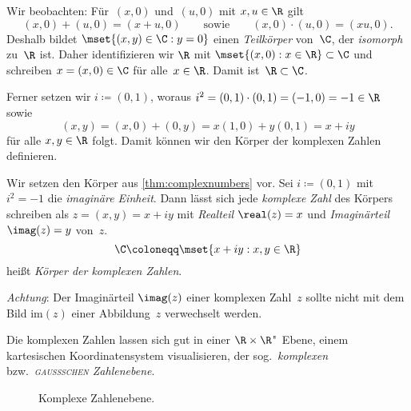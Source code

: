 \documentclass[a4paper]{article}
\begin{document}
Wir beobachten: Für~$(x, 0)$ und~$(u, 0)$ mit $x,u \in \R$ gilt
\begin{equation*}
    (x, 0) + (u, 0) = (x+u, 0) \qquad\text{sowie}\qquad (x, 0) \cdot (u, 0) = (xu, 0).
\end{equation*}
Deshalb bildet $\mset{(x,y) \in \C : y = 0}$ einen \emph{Teilkörper} von~$\C$, der \emph{isomorph} zu~$\R$ ist. Daher identifizieren wir $\R$ mit $\mset{(x, 0) : x \in \R} \subset \C$ und schreiben $x = (x, 0) \in \C$ für alle~$x \in \R$. Damit ist~$\R \subset \C$.

Ferner setzen wir $i \coloneqq (0, 1)$, woraus $i^2 = (0, 1)\cdot(0, 1) = (-1, 0) = -1 \in \R$ sowie
\begin{equation*}
    (x,y) = (x, 0)+(0,y) = x(1, 0)+y(0, 1) = x+iy
\end{equation*}
für alle $x,y \in \R$ folgt. Damit können wir den Körper der komplexen Zahlen definieren.

\begin{definition}
    Wir setzen den Körper aus \cref{thm:complexnumbers} vor. Sei $i \coloneqq (0, 1)$ mit~$i^2 = -1$ die \emph{imaginäre Einheit}. Dann lässt sich jede \emph{komplexe Zahl} des Körpers schreiben als $z = (x,y) = x+iy$ mit \emph{Realteil} $\real(z) = x$ und \emph{Imaginärteil} $\imag(z) = y$ von~$z$.
    \begin{equation*}
        \C \coloneqq \mset{x+iy : x,y \in \R}
    \end{equation*}
    heißt \emph{Körper der komplexen Zahlen}.
\end{definition}

\emph{Achtung}: Der Imaginärteil $\imag(z)$ einer komplexen Zahl~$z$ sollte nicht mit dem Bild $\mathrm{im}(z)$ einer Abbildung~$z$ verwechselt werden.

Die komplexen Zahlen lassen sich gut in einer $\R\times\R$"~Ebene, einem kartesischen Koordinatensystem visualisieren, der sog.\ \emph{komplexen} bzw.\ \emph{\textsc{gaußschen} Zahlenebene}.

\begin{figure}
    \caption{Komplexe Zahlenebene.}
\end{figure}
\end{document}
